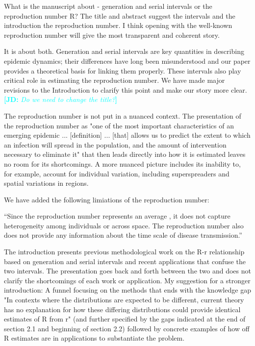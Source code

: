 \documentclass[12pt]{article}
\newcommand{\revtext}{\textsf}
\newcommand{\comment}[3]{\textcolor{#1}{\textbf{[#2: }\textsl{#3}\textbf{]}}}
\newcommand{\jd}[1]{\comment{cyan}{JD}{#1}}
\begin{document}
\revtext{What is the manuscript about - generation and serial intervals or the reproduction number R? The title and abstract suggest the intervals and the introduction the reproduction number. I think opening with the well-known reproduction number will give the most transparent and coherent story.}

It is about both. Generation and serial intervals are key quantities in describing epidemic dynamics; their differences have long been misunderstood and our paper provides a theoretical basis for linking them properly. These intervals also play critical role in estimating the reproduction number. We have made major revisions to the Introduction to clarify this point and make our story more clear. 
\jd{Do we need to change the title?}

\revtext{The reproduction number is not put in a nuanced context. The presentation of the reproduction number as "one of the most important characteristics of an emerging epidemic ... [definition] ... [that] allows us to predict the extent to which an infection will spread in the population, and the amount of intervention necessary to eliminate it" that then leads directly into how it is estimated leaves no room for its shortcomings. A more nuanced picture includes its inability to, for example, account for individual variation, including superspreaders and spatial variations in regions.}

We have added the following limiations of the reproduction number:

``Since the reproduction number represents an average \citep{diekmann1990definition, anderson1991infectious}, it does not capture heterogeneity among individuals or across space.
The reproduction number also does not provide any information about the time scale of disease transmission.''

\revtext{The introduction presents previous methodological work on the R-r relationship based on generation and serial intervals and recent applications that confuse the two intervals. The presentation goes back and forth between the two and does not clarify the shortcomings of each work or application. My suggestion for a stronger introduction: A funnel focusing on the methods that ends with the knowledge gap "In contexts where the distributions are expected to be different, current theory has no explanation for how these differing distributions could provide identical estimates of R from r" (and further specified by the gaps indicated at the end of section 2.1 and beginning of section 2.2) followed by concrete examples of how off R estimates are in applications to substantiate the problem.}
\end{document}
